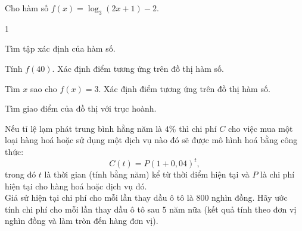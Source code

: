 \begin{bt}%

	Cho hàm số $f(x)=\log_3(2 x+1)-2$.
	\begin{enumEX}{1}
		\item Tìm tập xác định của hàm số.
		\item Tính $f(40)$. Xác định điểm tương ứng trên đồ thị hàm số.
		\item Tìm $x$ sao cho $f(x)=3$. Xác định điểm tương ứng trên đồ thị hàm số.
		\item Tìm giao điểm của đồ thị với trục hoành.
	\end{enumEX}
\end{bt}

\begin{bt}%

	Nếu tỉ lệ lạm phát trung bình hằng năm là $4 \%$ thì chi phí $C$ cho việc mua một loại hàng hoá hoặc sử dụng một dịch vụ nào đó sẽ được mô hình hoá bằng công thức:
	$$C(t)=P(1+0,04)^t,$$
	trong đó $t$ là thời gian (tính bằng năm) kể từ thời điểm hiện tại và $P$ là chi phí hiện tại cho hàng hoá hoặc dịch vụ đó.\\
	Giả sử hiện tại chi phí cho mỗi lần thay dầu ô tô là $ 800 $ nghìn đồng. Hãy ước tính chi phí cho mỗi lần thay dầu ô tô sau $ 5 $ năm nữa (kết quả tính theo đơn vị nghìn đồng và làm tròn đến hàng đơn vị).
\end{bt}

